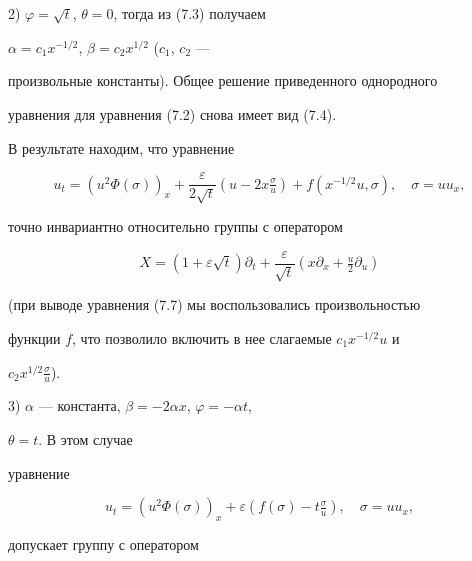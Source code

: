  


2) $\varphi=\sqrt{t}$, $\theta=0$, тогда из (7.3) получаем 


$\alpha=c_1x^{-1/2}$, $\beta=c_2x^{1/2}$ ($c_1$, $c_2$ --- 


произвольные константы). Общее решение приведенного однородного 


уравнения для уравнения (7.2) снова имеет вид (7.4). 


 


В результате находим, что уравнение 


\begin{equation} 


u_t=(u^2\Phi(\sigma))_x+\frac{\varepsilon}{2\sqrt{t}} 


(u-2x\tfrac{\sigma}{u})+f(x^{-1/2}u,\sigma),\quad 


\sigma=u u_x, \tag{7.7} 


\end{equation} 


точно инвариантно относительно группы с оператором 


\begin{equation} 


X=(1+\varepsilon\sqrt{t})\partial _t+ 


\frac{\varepsilon}{\sqrt{t}}(x\partial _x+\tfrac{u}{2} 


\partial _u) \tag{7.8} 


\end{equation} 


(при выводе уравнения (7.7) мы воспользовались произвольностью 


функции $f$, что позволило включить в нее слагаемые $c_1x^{-1/2}u$ и 


$c_2x^{1/2}\frac{\sigma}{u}$). 


 


3) $\alpha$ --- константа, $\beta=-2\alpha x$, $\varphi=-\alpha t$, 


$\theta=t$. В этом случае 


уравнение 


\begin{equation} 


u_t=(u^2\Phi(\sigma))_x+\varepsilon 


(f(\sigma)-t\tfrac{\sigma}{u}),\quad \sigma=u u_x, \tag{7.9} 


\end{equation} 


допускает группу с оператором 


